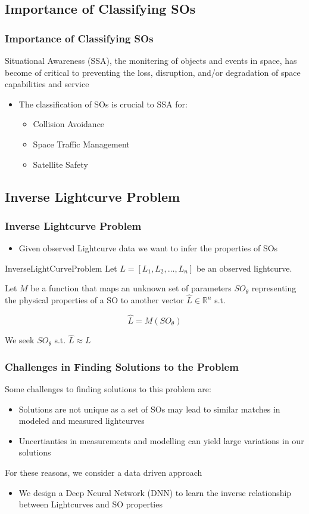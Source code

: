\documentclass[
	11pt, %
]{beamer}
\begin{document}
\subsection{Importance of Classifying SOs}
\begin{frame}
	\frametitle{Importance of Classifying SOs}
	Situational Awareness (SSA), the monitering of objects and events in space, has become of
critical to preventing the loss, disruption, and/or degradation of space capabilities and service

\begin{itemize}
	\item
	The classification of SOs is crucial to SSA for:
	\begin{itemize}
		\item
			Collision Avoidance
		\item
			Space Traffic Management
		\item
			Satellite Safety
	\end{itemize}
\end{itemize}
\end{frame}
\subsection{Inverse Lightcurve Problem}
\begin{frame}
	\frametitle{Inverse Lightcurve Problem}
	\begin{itemize}
		\item
			Given observed Lightcurve data we want to infer the properties of SOs
	\end{itemize}

	\begin{block}{InverseLightCurveProblem}
		Let $L = [L_1,L_2,\dots,L_n]$ be an observed lightcurve.

		Let $M$ be a function that maps an unknown set of parameters $SO_\theta$ representing the physical properties of a SO to another vector $\hat{L}\in\mathbb{R}^n$ s.t.

		\[\hat{L} = M(SO_\theta)\]

	We seek $SO_\theta$ s.t. $\hat{L} \approx L$
	\end{block}

	
\end{frame}
\begin{frame}
	\frametitle{Challenges in Finding Solutions to the Problem} 
	Some challenges to finding solutions to this problem are:
	\begin{itemize}
		\item
		Solutions are not unique as a set of SOs may lead to similar matches in modeled and measured lightcurves
		\item
		Uncertianties in measurements and modelling can yield large variations in our solutions
	\end{itemize}
	For these reasons, we consider a data driven approach
	\begin{itemize}
		\item
			We design a Deep Neural Network (DNN) to learn the inverse relationship between Lightcurves and SO properties 
	
	\end{itemize}

\end{frame}
\end{document}
